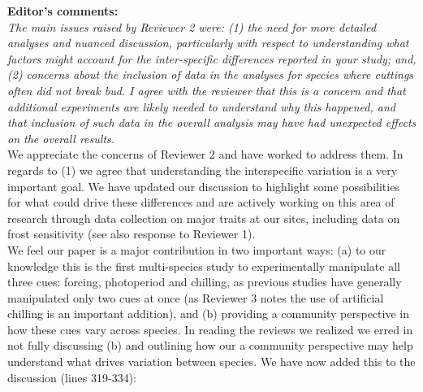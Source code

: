 \documentclass[11pt,a4paper]{article}
\begin{document}


{\bf Editor's comments:} \\

\emph{The main issues raised by Reviewer 2 were: (1) the need for more detailed analyses and
nuanced discussion, particularly with respect to understanding what factors might account for
the inter-specific differences reported in your study; and, (2) concerns about the inclusion
of data in the analyses for species where cuttings often did not break bud.  I agree with the
reviewer that this is a concern and that additional experiments are likely needed to
understand why this happened, and that inclusion of such data in the overall analysis may
have had unexpected effects on the overall results.}\\

We appreciate the concerns of Reviewer 2 and have worked to address them. In regards to (1) we agree that understanding the interspecific variation is a very important goal. We have updated our discussion to highlight some possibilities for what could drive these differences and are  actively working on this area of research through data collection on major traits at our sites, including data on frost sensitivity (see also response to Reviewer 1). \\

We feel our paper is a major contribution in two important ways: (a) to our knowledge this is the first multi-species study to experimentally manipulate all three cues: forcing, photoperiod and chilling, as previous studies have generally manipulated only two cues at once (as Reviewer 3 notes the use of artificial chilling is an important addition), and (b) providing a community perspective in how these cues vary across species. In reading the reviews we realized we erred in not fully discussing (b) and outlining how our a community perspective may help understand what drives variation between species. We have now added this to the discussion (lines 319-334):
\end{document}
